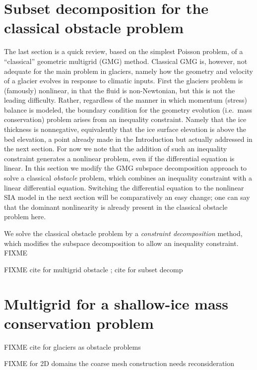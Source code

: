 \documentclass[letterpaper,final,12pt,reqno]{amsart}
\begin{document}
\section{Subset decomposition for the classical obstacle problem} \label{sec:obstacle}

The last section is a quick review, based on the simplest Poisson problem, of a ``classical'' geometric multigrid (GMG) method.  Classical GMG is, however, not adequate for the main problem in glaciers, namely how the geometry and velocity of a glacier evolves in response to climatic inputs.  First the glaciers problem is (famously) nonlinear, in that the fluid is non-Newtonian, but this is not the leading difficulty.  Rather, regardless of the manner in which momentum (stress) balance is modeled, the boundary condition for the geometry evolution (i.e.~mass conservation) problem arises from an inequality constraint.  Namely that the ice thickness is nonnegative, equivalently that the ice surface elevation is above the bed elevation, a point already made in the Introduction but actually addressed in the next section.  For now we note that the addition of such an inequality constraint generates a nonlinear problem, even if the differential equation is linear.  In this section we modify the GMG subspace decomposition approach to solve a classical \emph{obstacle} problem, which combines an inequality constraint with a linear differential equation.  Switching the differential equation to the nonlinear SIA model in the next section will be comparatively an easy change; one can say that the dominant nonlinearity is already present in the classical obstacle problem here.

We solve the classical obstacle problem by a \emph{constraint decomposition} \cite{Tai2003} method, which modifies the subspace decomposition to allow an inequality constraint.  FIXME

FIXME cite for multigrid obstacle \cite{BrandtCryer1983,Bueler2021,GraeserKornhuber2009,Jouvetetal2013}; cite for subset decomp \cite{Tai2003}


\section{Multigrid for a shallow-ice mass conservation problem} \label{sec:sia}

FIXME cite for glaciers as obstacle problems \cite{Bueler2016,Bueler2020,Calvoetal2002,JouvetBueler2012}

FIXME for 2D domains the coarse mesh construction needs reconsideration
\end{document}
